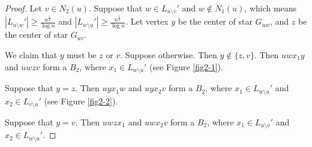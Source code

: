 \documentclass[11pt,a4paper]{article}
\theoremstyle{definition}
\newenvironment{claimproof}
  {\renewcommand{\qedsymbol}{\ensuremath{\blacksquare}}\proof}
  {\endproof}
  {\endproof}
\begin{document}
\begin{proof}


            \begin{claimproof}
                Let $v \in N_2(u)$.
                Suppose that $w \in L_{u \setminus v}'$ and $w \notin N_1(u)$, which means $|L_{u \setminus w}'| \geq \frac{n^{\frac{1}{2}}}{\log n}$ and $|L_{w \setminus u}'| \geq \frac{n^{\frac{1}{2}}}{\log n}$.
                Let vertex $y$ be the center of star $G_{uw}$, and $z$ be the center of star $G_{uv}$.

                We claim that $y$ must be $z$ or $v$.
                Suppose otherwise. Then $y \notin \{z, v\}$.
                Then $u w x_1 y$ and $u w z v$ form a $B_2$, where $x_1 \in L_{w \setminus u}'$ (see Figure \ref{fig2-1}).

                Suppose that $y = z$.
                Then $u y x_1 w$ and $u y x_2 v$ form a $B_2$, where $x_1 \in L_{w \setminus u}'$ and $x_2 \in L_{v \setminus u}'$ (see Figure \ref{fig2-2}).

                Suppose that $y = v$.
                Then $u w z x_1$ and $u w x_2 v$ form a $B_2$, where $x_1 \in L_{u \setminus v}'$ and $x_2 \in L_{w \setminus u}'$. 


\end{claimproof}
\end{proof}
\end{document}
